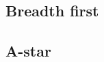 \documentclass[../../main.tex]{subfiles}
\begin{document}
\subsection{Breadth first}%
\label{sub:breadth_first}




\subsection{A-star}%
\label{sub:a_star}




	
\end{document}
